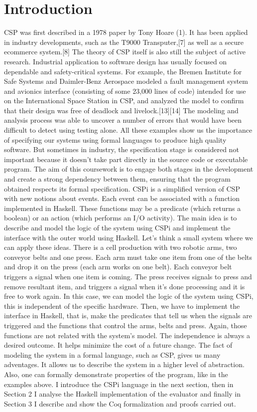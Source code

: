 \documentclass{comjnl}
\begin{document}
\section{Introduction}
CSP was first described in a 1978 paper by Tony Hoare (1). It has been applied in 
industry developments, such as the T9000 Transputer,[7] as well as a secure ecommerce system.[8]
The theory of CSP itself is also still the subject of active research. Industrial application to software design has usually focused on dependable and safety-critical systems. For example, the Bremen Institute for Safe Systems and Daimler-Benz Aerospace modeled a fault management system and avionics interface (consisting of some 23,000 lines of code) intended for use on the International Space Station in CSP, and analyzed the model to confirm that their design was free of deadlock and livelock.[13][14] The modeling and analysis process was able to uncover a number of errors that would have been difficult to detect using testing alone. 
All these examples show us the importance of specifying our systems using formal languages to produce high quality software.
But sometimes in industry, the specification stage is considered not important because it doesn't take part directly in the source code or executable program. The aim of this coursework is to engage both stages in the development and create a strong dependency between them, ensuring that the program obtained respects its formal specification.
CSPi is a simplified version of CSP with new notions about events. Each event can be associated with a function implemented in Haskell. These functions 
may be a predicate (which returns a boolean) or an action (which performs an I/O activity).
The main idea is to describe and model the logic of the system using CSPi and implement the interface with the outer world using Haskell. 
Let's think a small system where we can apply these ideas. There is a cell production with two robotic arms, two conveyor belts and one press. Each arm must take one item from one of the belts and drop it on the press (each arm works on one belt). Each conveyor belt triggers a signal when one item is coming. The press receives signals to press and remove resultant item, and triggers a signal when it's done processing and it is free to work again. In this case, we can model the logic of the system using CSPi, this is independent of the specific hardware. Then, we have to implement the interface in Haskell, that is, make the predicates that tell us when the signals are triggered and the functions that control the arms, belts and press. Again, those functions are not related with the system's model. 
The independence is always a desired outcome. It helps minimize the cost of a future change. 
The fact of modeling the system in a formal language, such as CSP, gives us many adventages. It allows us to describe the system in a higher level of abstraction. Also, one can formally demonstrate properties of the program, like in the examples above.
I introduce the CSPi language in the next section, then in Section 2 I analyse the Haskell implementation of the evaluator and finally in Section 3 I describe and show the Coq formalization and proofs carried out.
\end{document}
